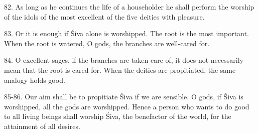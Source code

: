 82. As long as he continues the life of a householder he shall perform
the worship of the idols of the most excellent of the five deities with pleasure.

83. Or it is enough if Śiva alone is worshipped. The root is the most important.
When the root is watered, O gods, the branches are well-cared for.

84. O excellent sages, if the branches are taken care of, it does not
necessarily mean that the root is cared for. When the deities are propitiated,
the same analogy holds good.

85-86. Our aim shall be to propitiate Śiva if we are sensible. O gods, if Śiva
is worshipped, all the gods are worshipped. Hence a person who wants to do good
to all living beings shall worship Śiva, the benefactor of the world, for
the attainment of all desires.

